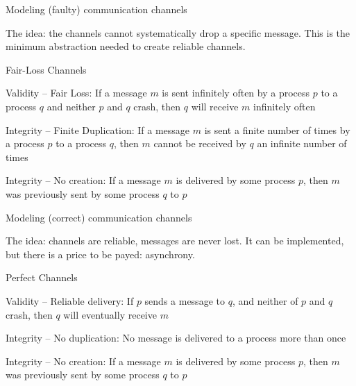 \begin{frame}{Modeling (faulty) communication channels}

The idea: the channels cannot systematically drop a specific message. This is the minimum abstraction
needed to create reliable channels.

\bigskip
\begin{block}{Fair-Loss Channels}
	
\BIL
\item \alert{ Validity -- Fair Loss}: If a message $m$ is sent infinitely often by a process $p$ to a process $q$ and
  neither $p$ and $q$ crash, then $q$ will receive $m$ infinitely often
\item \alert{Integrity -- Finite Duplication}: If a message $m$ is sent a finite number of times by a process $p$ to
a process $q$, then $m$ cannot be received by $q$ an infinite number of times
\item \alert{Integrity -- No creation}: If a message $m$ is delivered by some process $p$, then $m$ was previously sent
by some process $q$ to $p$
\EIL

\end{block}


\end{frame}

\begin{frame}{Modeling (correct) communication channels}

The idea: channels are reliable, messages are never lost. It can be implemented, but 
there is a price to be payed: asynchrony.

\bigskip
\begin{block}{Perfect Channels}

\BIL
\item \alert{Validity -- Reliable delivery}: If $p$ sends a message to $q$, and neither of $p$ and $q$ crash, then 
$q$ will \alert{eventually} receive $m$
\item \alert{Integrity -- No duplication}: No message is delivered to a process more than once
\item \alert{Integrity -- No creation}: If a message $m$ is delivered by some process $p$, then $m$ was previously sent
by some process $q$ to $p$
\EIL

\end{block}


\end{frame}


